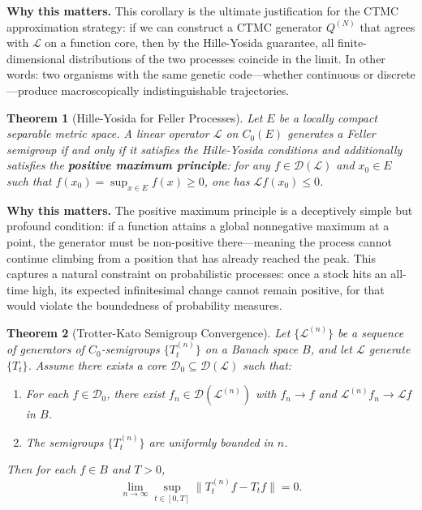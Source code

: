 \documentclass[11pt,a4paper,openany]{book}
\theoremstyle{definition}
\theoremstyle{plain}
\newtheorem{theorem}{Theorem}[chapter]
\theoremstyle{remark}
\newcommand{\1}{\mathbbm{1}}
\newcommand{\calL}{\mathcal{L}}
\newcommand{\calD}{\mathcal{D}}
\begin{document}
\medskip
\noindent\textbf{Why this matters.} This corollary is the ultimate justification for the CTMC approximation strategy: if we can construct a CTMC generator $Q^{(N)}$ that agrees with $\mathcal{L}$ on a function core, then by the Hille-Yosida guarantee, all finite-dimensional distributions of the two processes coincide in the limit. In other words: two organisms with the same genetic code---whether continuous or discrete---produce macroscopically indistinguishable trajectories.

\begin{theorem}[Hille-Yosida for Feller Processes]
Let $E$ be a locally compact separable metric space. A linear operator $\calL$ on $C_{0}(E)$ generates a Feller semigroup if and only if it satisfies the Hille-Yosida conditions and additionally satisfies the \textbf{positive maximum principle}: for any $f \in \calD(\calL)$ and $x_{0} \in E$ such that $f(x_{0}) = \sup_{x \in E} f(x) \geq 0$, one has $\calL f(x_{0}) \leq 0$.
\end{theorem}

\medskip
\noindent\textbf{Why this matters.} The positive maximum principle is a deceptively simple but profound condition: if a function attains a global nonnegative maximum at a point, the generator must be non-positive there---meaning the process cannot continue climbing from a position that has already reached the peak. This captures a natural constraint on probabilistic processes: once a stock hits an all-time high, its expected infinitesimal change cannot remain positive, for that would violate the boundedness of probability measures.

\begin{theorem}[Trotter-Kato Semigroup Convergence]
Let $\{\calL^{(n)}\}$ be a sequence of generators of $C_{0}$-semigroups $\{T_{t}^{(n)}\}$ on a Banach space $B$, and let $\calL$ generate $\{T_{t}\}$. Assume there exists a core $\calD_{0} \subseteq \calD(\calL)$ such that:
\begin{enumerate}[label=(\arabic*)]
    \item For each $f \in \calD_{0}$, there exist $f_{n} \in \calD(\calL^{(n)})$ with $f_{n} \to f$ and $\calL^{(n)} f_{n} \to \calL f$ in $B$.
    \item The semigroups $\{T_{t}^{(n)}\}$ are uniformly bounded in $n$.
\end{enumerate}
Then for each $f \in B$ and $T > 0$,
\[
\lim_{n \to \infty} \sup_{t \in [0,T]} \|T_{t}^{(n)} f - T_{t} f\| = 0.
\]
\end{theorem}
\end{document}
